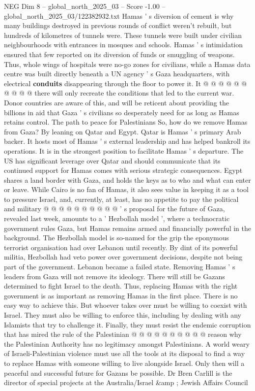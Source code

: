 \begin{textsample}{NEG Dim 8 – global\_north\_2025\_03 – Score -1.00 – global\_north\_2025\_03/122382932.txt}
Hamas ' s diversion of cement is why many buildings destroyed in previous rounds of conflict weren't rebuilt, but hundreds of kilometres of tunnels were.
These tunnels were built under civilian neighbourhoods with entrances in mosques and schools.
Hamas ' s intimidation ensured that few reported on its diversion of funds or smuggling of weapons.
Thus, whole wings of hospitals were no-go zones for civilians, while a Hamas data centre was built directly beneath a UN agency ' s Gaza headquarters, with electrical \textbf{conduits} disappearing through the floor to power it.
It @ @ @ @ @ @ @ @ @ @ there will only recreate the conditions that led to the current war.
Donor countries are aware of this, and will be reticent about providing the billions in aid that Gaza ' s civilians so desperately need for as long as Hamas retains control.
The path to peace for Palestinians So, how do we remove Hamas from Gaza?
By leaning on Qatar and Egypt.
Qatar is Hamas ' s primary Arab backer.
It hosts most of Hamas ' s external leadership and has helped bankroll its operations.
It is in the strongest position to facilitate Hamas ' s departure.
The US has significant leverage over Qatar and should communicate that its continued support for Hamas comes with serious strategic consequences.
Egypt shares a land border with Gaza, and holds the keys as to who and what can enter or leave.
While Cairo is no fan of Hamas, it also sees value in keeping it as a tool to pressure Israel, and, currently, at least, has no appetite to pay the political and military @ @ @ @ @ @ @ @ @ @ ' s proposal for the future of Gaza, revealed last week, amounts to a ' Hezbollah model ', where a technocratic government rules Gaza, but Hamas remains armed and financially powerful in the background.
The Hezbollah model is so-named for the grip the eponymous terrorist organisation had over Lebanon until recently.
By dint of its powerful militia, Hezbollah had veto power over government decisions, despite not being part of the government.
Lebanon became a failed state.
Removing Hamas ' s leaders from Gaza will not remove its ideology.
There will still be Gazans determined to fight Israel to the death.
Thus, replacing Hamas with the right government is as important as removing Hamas in the first place.
There is no easy way to achieve this.
But whoever takes over must be willing to coexist with Israel.
They must also be willing to enforce this, including by dealing with any Islamists that try to challenge it.
Finally, they must resist the endemic corruption that has mired the rule of the Palestinian @ @ @ @ @ @ @ @ @ @ reason why the Palestinian Authority has no legitimacy amongst Palestinians.
A world weary of Israeli-Palestinian violence must use all the tools at its disposal to find a way to replace Hamas with someone willing to live alongside Israel.
Only then will a peaceful and successful future for Gazans be possible.
Dr Bren Carlill is the director of special projects at the Australia/Israel \&amp ; Jewish Affairs Council

\end{textsample}
